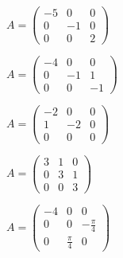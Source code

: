\begin{multicols}{3}
\begin{enumtasks}
			\label{linsys_funcs:exponential}
			\item \( A = \begin{pmatrix} -5 & 0 & 0 \\ 0 & -1 & 0 \\ 0 & 0 & 2 \end{pmatrix} \) %
			\item \( A = \begin{pmatrix} -4 & 0 & 0 \\ 0 & -1 & 1 \\ 0 & 0 & -1 \end{pmatrix} \) %
			\item \( A = \begin{pmatrix} -2 & 0 & 0 \\ 1 & -2 & 0 \\ 0 & 0 & 0 \end{pmatrix} \) %
			\item \( A = \begin{pmatrix} 3 & 1 & 0 \\ 0 & 3 & 1 \\ 0 & 0 & 3 \end{pmatrix} \) %
			\item \( A = \begin{pmatrix} -4 & 0 & 0 \\ 0 & 0 & -\frac{\pi}{4} \\ 0 & \frac{\pi}{4} & 0 \end{pmatrix} \) %

\end{enumtasks}
\end{multicols}
